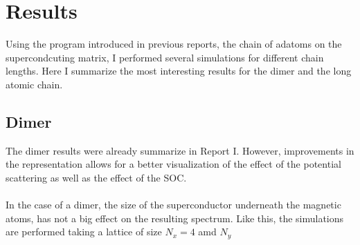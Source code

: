 \documentclass[letterpaper,12pt]{article}
\begin{document}
\section{Results}
Using the program introduced in previous reports, the chain of adatoms on the supercondcuting matrix, I performed several simulations for different chain lengths. Here I summarize the most interesting results for the dimer and the long atomic chain.

\subsection{Dimer}
The dimer results were already summarize in Report I. However, improvements in the representation allows for a better visualization of the effect of the potential scattering as well as the effect of the SOC.\\ \\
In the case of a dimer, the size of the superconductor underneath the magnetic atoms, has not a big effect on the resulting spectrum. Like this, the simulations are performed taking a lattice of size $N_x = 4$ amd $N_y$ 



   
 

{}

\end{document}
